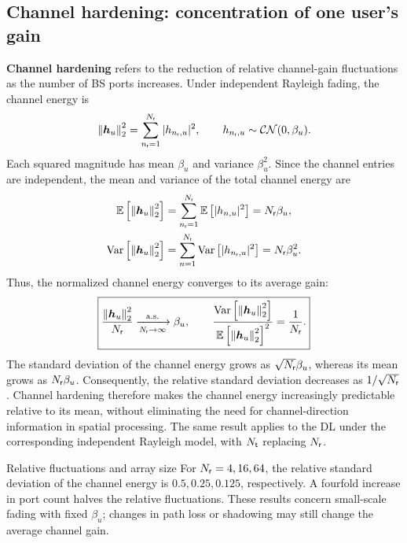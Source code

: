 \subsection{Channel hardening: concentration of one user's gain}
\textbf{Channel hardening} refers to the reduction of relative channel-gain fluctuations as the number of BS ports increases. Under independent Rayleigh fading, the channel energy is
\begin{equation*}
	\left\|\bm{h}_u\right\|_2^2=\sum_{n_{\mathsf{r}}=1}^{N_{\mathsf{r}}}|h_{n_{\mathsf{r}},u}|^2,
	\qquad h_{n_{\mathsf{r}},u}\sim\mathcal{CN}(0,\beta_u).
\end{equation*}
Each squared magnitude has mean $\beta_u$ and variance $\beta_u^2$. Since the channel entries are independent, the mean and variance of the total channel energy are
\begin{equation}
	\begin{split}
		\mathbb{E}\left[\left\|\bm{h}_u\right\|_2^2\right]
		&=\sum_{n_{\mathsf{r}}=1}^{N_{\mathsf{r}}}\mathbb{E}\left[|h_{n,u}|^2\right]
		=N_{\mathsf{r}}\beta_u,\\
		\operatorname{Var}\left[\left\|\bm{h}_u\right\|_2^2\right]
		&=\sum_{n=1}^{N_{\mathsf{r}}}\operatorname{Var}\left[|h_{n_{\mathsf{r}},u}|^2\right]
		=N_{\mathsf{r}}\beta_u^2.
	\end{split}
	\label{eq:channel-moments-05}
\end{equation}
Thus, the normalized channel energy converges to its average gain:
\begin{equation}
	\boxed{
		\frac{\left\|\bm{h}_u\right\|_2^2}{N_{\mathsf{r}}}
		\xrightarrow[N_{\mathsf{r}}\to\infty]{\mathrm{a.s.}}\beta_u,
		\qquad
		\frac{\operatorname{Var}\left[\left\|\bm{h}_u\right\|_2^2\right]}
		{\mathbb{E}\left[\left\|\bm{h}_u\right\|_2^2\right]^2}
		=\frac{1}{N_{\mathsf{r}}}.
	}
	\label{eq:hardening-05}
\end{equation}
The standard deviation of the channel energy grows as $\sqrt{N_{\mathsf{r}}}\beta_u$, whereas its mean grows as $N_{\mathsf{r}}\beta_u$. Consequently, the relative standard deviation decreases as $1/\sqrt{N_{\mathsf{r}}}$. Channel hardening therefore makes the channel energy increasingly predictable relative to its mean, without eliminating the need for channel-direction information in spatial processing. The same result applies to the DL under the corresponding independent Rayleigh model, with $N_{\mathsf{t}}$ replacing $N_{\mathsf{r}}$.

\begin{example}{Relative fluctuations and array size}
	For $N_{\mathsf{r}}=4,16,64$, the relative standard deviation of the channel energy is $0.5,0.25,0.125$, respectively. A fourfold increase in port count halves the relative fluctuations. These results concern small-scale fading with fixed $\beta_u$; changes in path loss or shadowing may still change the average channel gain.
\end{example}


